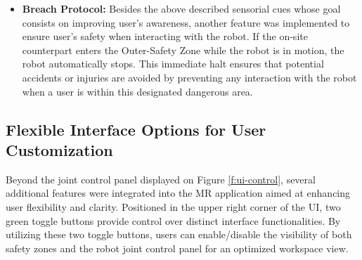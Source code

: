 \begin{itemize}
\item \textbf{Breach Protocol:} Besides the above described sensorial cues whose goal consists on improving user's awareness, another feature was implemented to ensure user's safety when interacting with the robot. If the on-site counterpart enters the Outer-Safety Zone while the robot is in motion, the robot automatically stops. This immediate halt ensures that potential accidents or injuries are avoided by preventing any interaction with the robot when a user is within this designated dangerous area.
\end{itemize}
    
\subsection{Flexible Interface Options for User Customization}

Beyond the joint control panel displayed on Figure \ref{f:ui-control}, several additional features were integrated into the \ac{MR} application aimed at enhancing user flexibility and clarity. Positioned in the upper right corner of the \ac{UI}, two green toggle buttons provide control over distinct interface functionalities. By utilizing these two toggle buttons, users can enable/disable the visibility of both safety zones and the robot joint control panel for an optimized workspace view. 


